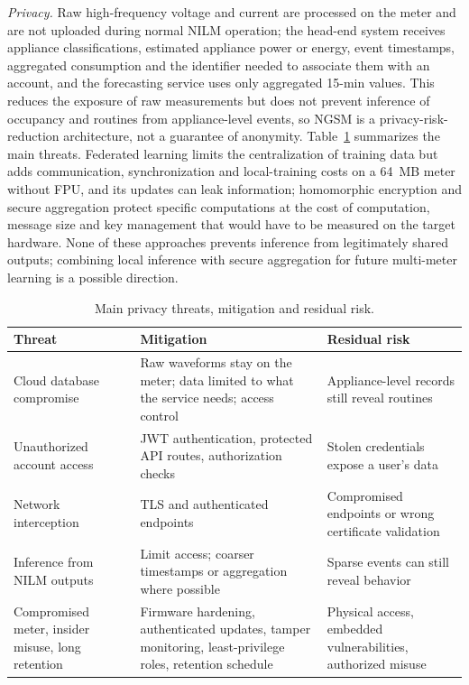 \textit{Privacy.} Raw high-frequency voltage and current are processed on the meter and are not uploaded during normal NILM operation; the head-end system receives appliance classifications, estimated appliance power or energy, event timestamps, aggregated consumption and the identifier needed to associate them with an account, and the forecasting service uses only aggregated 15-min values. This reduces the exposure of raw measurements but does not prevent inference of occupancy and routines from appliance-level events, so NGSM is a privacy-risk-reduction architecture, not a guarantee of anonymity. Table~\ref{tab:privacy_threats} summarizes the main threats. Federated learning limits the centralization of training data but adds communication, synchronization and local-training costs on a 64~MB meter without FPU, and its updates can leak information; homomorphic encryption and secure aggregation protect specific computations at the cost of computation, message size and key management that would have to be measured on the target hardware. None of these approaches prevents inference from legitimately shared outputs; combining local inference with secure aggregation for future multi-meter learning is a possible direction.

\begin{table}[H]
\centering
\caption{Main privacy threats, mitigation and residual risk.}
\label{tab:privacy_threats}
\footnotesize
\begin{tabular}{@{}p{2.3cm}p{3.1cm}p{3.5cm}@{}}
\toprule
Threat & Mitigation & Residual risk \\
\midrule
Cloud database compromise & Raw waveforms stay on the meter; data limited to what the service needs; access control & Appliance-level records still reveal routines \\
Unauthorized account access & JWT authentication, protected API routes, authorization checks & Stolen credentials expose a user's data \\
Network interception & TLS and authenticated endpoints & Compromised endpoints or wrong certificate validation \\
Inference from NILM outputs & Limit access; coarser timestamps or aggregation where possible & Sparse events can still reveal behavior \\
Compromised meter, insider misuse, long retention & Firmware hardening, authenticated updates, tamper monitoring, least-privilege roles, retention schedule & Physical access, embedded vulnerabilities, authorized misuse \\
\bottomrule
\end{tabular}
\end{table}

